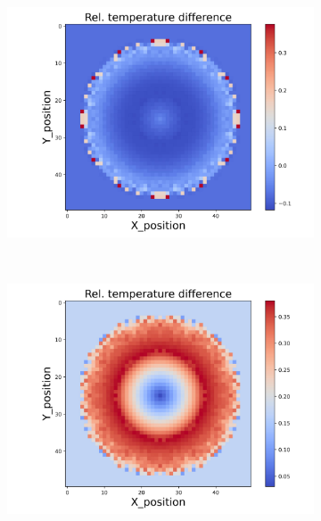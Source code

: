 \begin{figure}[h]
\begin{minipage}{\textwidth}
\begin{subfigure}{0.325\textwidth}
            \centering
            \includegraphics[width=\textwidth]{figures/raw_data/31/lin_square/T_bias.jpg}
        \end{subfigure}
    \end{minipage}\\
    \begin{minipage}{\textwidth}
        \centering
        \begin{subfigure}{0.325\textwidth}
            \centering
            \includegraphics[width=\textwidth]{figures/raw_data/32/lin_square/T_bias.jpg}
        \end{subfigure}
        \begin{subfigure}{0.325\textwidth}

\end{subfigure}
\end{minipage}
\end{figure}
